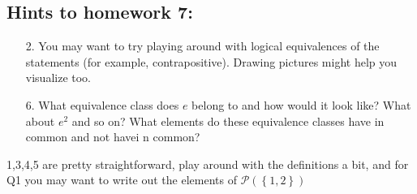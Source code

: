 \documentclass[letterpaper,12pt]{article}
\newcommand{\set}[1]{\left\{ #1 \right\}}
\begin{document}
\subsection*{Hints to homework 7:}
\begin{enumerate}
\item[2.] You may want to try playing around with logical equivalences of the statements (for example, contrapositive). Drawing pictures might help you visualize too.
\item[6.] What equivalence class does $e$ belong to and how would it look like? What about $e^2$ and so on? What elements do these equivalence classes have in common and not havei n common?
\end{enumerate}
1,3,4,5 are pretty straightforward, play around with the definitions a bit, and for Q1 you may want to write out the elements of $\mathcal{P}(\set{1,2})$
\end{document}
